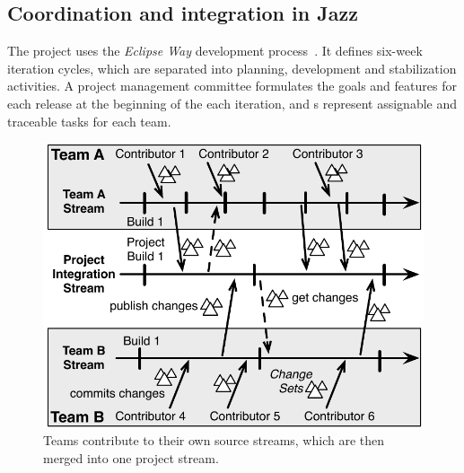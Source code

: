 \subsection{Coordination and integration in Jazz}

The project uses the \emph{Eclipse Way} development process~\cite{frost:ieeesoftware:2007}.
It defines six-week iteration cycles, which are separated into planning,
development and stabilization activities. A project management committee
formulates the goals and features for each release at the beginning of the each
iteration, and s represent assignable and traceable tasks for each
team.

\begin{figure}[t]
\begin{center}
\includegraphics[width=\columnwidth]{figures/BuildResult}
\caption{Teams contribute to their own source streams, which are then merged into one project stream.}
\label{fig:BuildResult}
\end{center}
\end{figure}


